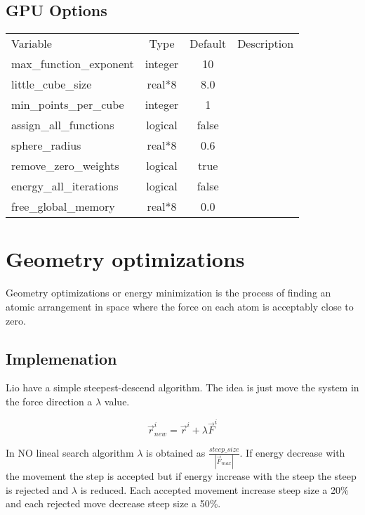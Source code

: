 \documentclass[journal=jctcce,manuscript=article]{achemso}
\begin{document}
    \subsection{GPU Options}
    \begin{table}  [H]
      \begin{center}
      \begin{tabular}{ l c c l}
         Variable & Type & Default & Description \\
         max\_function\_exponent & integer & 10 & \\
         little\_cube\_size & real*8 & 8.0 & \\
         min\_points\_per\_cube & integer & 1 & \\
         assign\_all\_functions & logical & false & \\
         sphere\_radius & real*8 & 0.6 & \\
         remove\_zero\_weights & logical & true & \\
         energy\_all\_iterations & logical & false & \\
         free\_global\_memory & real*8 & 0.0 & \\
       \end{tabular}
       \end{center}
      \label{lio.ecp.var.2}
    \end{table}    

\newpage
\section{Geometry optimizations}

Geometry optimizations or energy minimization is the process of finding an atomic arrangement in space where the force on each atom is acceptably close to zero.

    \subsection{Implemenation}
    
    Lio have a simple steepest-descend algorithm. The idea is just move the system in the force direction a $\lambda$ value.
    
    \begin{equation}
      \vec{r}^i_{new}=\vec{r}^i + \lambda  \vec{F}^i  
      \label{new_force}
    \end{equation}
    
    In NO lineal search algorithm $\lambda$ is obtained as $\frac{steep\_ size}{|\vec{F}_{max}|}$. If energy decrease with the movement the step is accepted but if energy increase with the steep the steep is rejected and $\lambda$ is reduced. Each accepted movement increase steep size a 20\% and each rejected move decrease steep size a 50\%.
    
\end{document}
